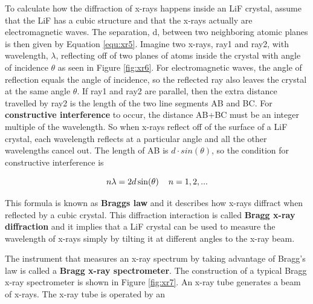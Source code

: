 To calculate how the diffraction of x-rays happens inside an LiF crystal, assume that the LiF has a cubic structure and that the x-rays actually are electromagnetic waves. The separation, d, between  two neighboring atomic planes is then given by Equation \ref{equ:xr5}. Imagine two x-rays, ray1 and ray2, with wavelength, $\lambda$, reflecting off of two planes of atoms inside the crystal with angle of incidence $\theta$ as seen in Figure \ref{fig:xr6}. For electromagnetic waves, the angle of reflection equals the angle of incidence, so the reflected ray also leaves the crystal at the same angle $\theta$. If ray1 and ray2 are parallel, then the extra distance travelled by ray2 is the length of the two line segments AB and BC. For {\bf constructive interference} to occur, the distance AB+BC must be an integer multiple of the wavelength. So when x-rays reflect off of the surface of a LiF crystal, each wavelength reflects at a particular angle and all the other wavelengths cancel out. The length of AB is $d\cdot sin(\theta)$, so the condition for constructive interference is

\begin{equation}
n\lambda=2d\sin(\theta)\hspace{4mm} n=1,2,...
\label{equ:xr6}
\end{equation}

This formula is known as {\bf Braggs law} and it describes how x-rays diffract when reflected by a cubic crystal. This diffraction interaction is called {\bf Bragg x-ray diffraction} and it implies that a LiF crystal can be used to measure the wavelength of x-rays simply by tilting it at different angles to the x-ray beam.

The instrument that measures an x-ray spectrum by taking advantage of Bragg's law is called a {\bf Bragg x-ray spectrometer}. The construction of a typical Bragg x-ray spectrometer is shown in Figure \ref{fig:xr7}. An x-ray tube generates a beam of x-rays. The x-ray tube is operated by an

